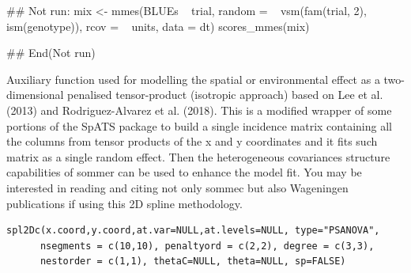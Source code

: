 \documentclass[a4paper]{book}
\begin{document}
%
\begin{Examples}
\begin{ExampleCode}
## Not run: 
mix <- mmes(BLUEs ~ trial,
            random = ~ vsm(fam(trial, 2), ism(genotype)),
            rcov = ~ units, data = dt)
scores_mmes(mix)

## End(Not run)
\end{ExampleCode}
\end{Examples}
%
\begin{Description}\relax

Auxiliary function used for modelling the spatial or environmental effect as a 
two-dimensional penalised tensor-product (isotropic approach) based on Lee et al. 
(2013) and Rodriguez-Alvarez et al. (2018). This is a modified wrapper of some 
portions of the SpATS package to build a single incidence matrix containing all
the columns from tensor products of the x and y coordinates and it fits such matrix 
as a single random effect. Then the heterogeneous covariances structure capabilities
of sommer can be used to enhance the model fit. You may be interested in reading and 
citing not only sommec but also Wageningen publications if using this 2D spline methodology.

\end{Description}
%
\begin{Usage}
\begin{verbatim}
spl2Dc(x.coord,y.coord,at.var=NULL,at.levels=NULL, type="PSANOVA", 
      nsegments = c(10,10), penaltyord = c(2,2), degree = c(3,3), 
      nestorder = c(1,1), thetaC=NULL, theta=NULL, sp=FALSE)
\end{verbatim}
\end{Usage}
%
\end{document}
